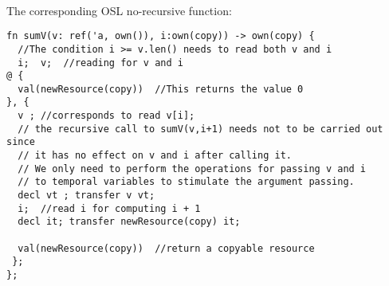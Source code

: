 \documentclass[runningheads]{llncs}
\begin{document}
~\\
The corresponding OSL no-recursive function:
\renewcommand{\ttdefault}{pcr}
\begin{lstlisting}
fn sumV(v: ref('a, own()), i:own(copy)) -> own(copy) {
  //The condition i >= v.len() needs to read both v and i
  i;  v;  //reading for v and i
@ {
  val(newResource(copy))  //This returns the value 0
}, {
  v ; //corresponds to read v[i];
  // the recursive call to sumV(v,i+1) needs not to be carried out since
  // it has no effect on v and i after calling it.
  // We only need to perform the operations for passing v and i 
  // to temporal variables to stimulate the argument passing. 
  decl vt ; transfer v vt;
  i;  //read i for computing i + 1
  decl it; transfer newResource(copy) it;

  val(newResource(copy))  //return a copyable resource
 };
};
\end{lstlisting}
\end{document}
